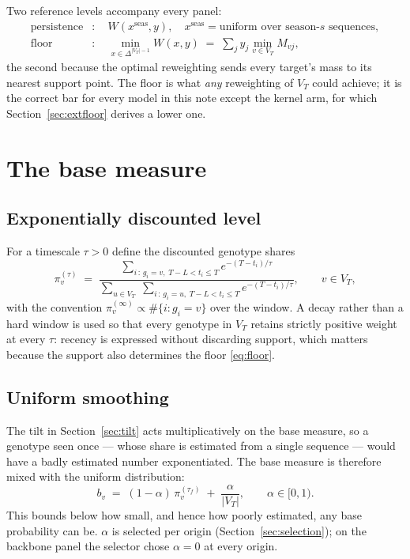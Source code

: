 \documentclass[11pt]{article}
\theoremstyle{remark}
\newcommand{\1}{\mathbf{1}}
\newcommand{\VT}{V_T}
\begin{document}
Two reference levels accompany every panel:
\begin{align}
  \text{persistence} &:\quad W(x^{\mathrm{seas}}, y),
    \quad x^{\mathrm{seas}} = \text{uniform over season-$s$ sequences},\\
  \text{floor} &:\quad \min_{x \in \Delta^{|\VT|-1}} W(x,y)
    \;=\; \sum_j y_j \min_{v \in \VT} M_{vj},
  \label{eq:floor}
\end{align}
the second because the optimal reweighting sends every target's mass to its nearest
support point. The floor is what \emph{any} reweighting of $\VT$ could achieve; it is
the correct bar for every model in this note except the kernel arm, for which
Section~\ref{sec:extfloor} derives a lower one.

\section{The base measure}

\subsection{Exponentially discounted level}

For a timescale $\tau>0$ define the discounted genotype shares
\begin{equation}
  \pi^{(\tau)}_v \;=\;
  \frac{\displaystyle\sum_{i \,:\, g_i = v,\; T-L < t_i \le T} e^{-(T-t_i)/\tau}}
       {\displaystyle\sum_{u \in \VT}\;\sum_{i \,:\, g_i = u,\; T-L < t_i \le T} e^{-(T-t_i)/\tau}},
  \qquad v \in \VT,
  \label{eq:level}
\end{equation}
with the convention $\pi^{(\infty)}_v \propto \#\{i : g_i = v\}$ over the window. A decay
rather than a hard window is used so that every genotype in $\VT$ retains strictly
positive weight at every $\tau$: recency is expressed without discarding support, which
matters because the support also determines the floor \eqref{eq:floor}.

\subsection{Uniform smoothing}

The tilt in Section~\ref{sec:tilt} acts multiplicatively on the base measure, so a
genotype seen once --- whose share is estimated from a single sequence --- would have a
badly estimated number exponentiated. The base measure is therefore mixed with the
uniform distribution:
\begin{equation}
  b_v \;=\; (1-\alpha)\,\pi^{(\tau_f)}_v \;+\; \frac{\alpha}{|\VT|},
  \qquad \alpha \in [0,1).
  \label{eq:base}
\end{equation}
This bounds below how small, and hence how poorly estimated, any base probability can be.
$\alpha$ is selected per origin (Section~\ref{sec:selection}); on the backbone panel the
selector chose $\alpha = 0$ at every origin.
\end{document}
